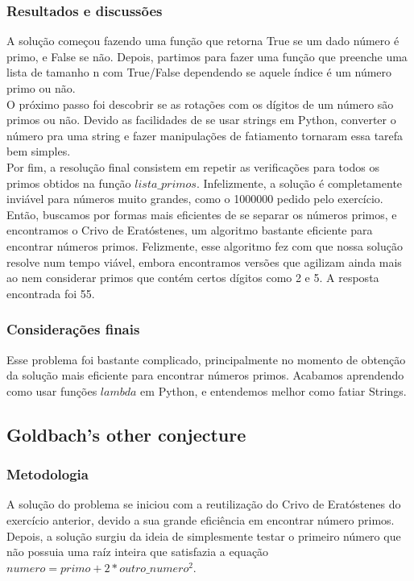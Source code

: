 \documentclass{article}
\begin{document}
        \subsubsection{Resultados e discussões}
        A solução começou fazendo uma função que retorna True se um dado número é primo, e False se não. Depois, partimos para fazer uma função que preenche uma lista de tamanho n com True/False dependendo se aquele índice é um número primo ou não.\\
        O próximo passo foi descobrir se as rotações com os dígitos de um número são primos ou não. Devido as facilidades de se usar strings em Python, converter o número pra uma string e fazer manipulações de fatiamento tornaram essa tarefa bem simples.\\
        Por fim, a resolução final consistem em repetir as verificações para todos os primos obtidos na função $lista\_primos$. Infelizmente, a solução é completamente inviável para números muito grandes, como o 1000000 pedido pelo exercício. Então, buscamos por formas mais eficientes de se separar os números primos, e encontramos o Crivo de Eratóstenes, um algoritmo bastante eficiente para encontrar números primos. Felizmente, esse algoritmo fez com que nossa solução resolve num tempo viável, embora encontramos versões que agilizam ainda mais ao nem considerar primos que contém certos dígitos como 2 e 5.
        A resposta encontrada foi 55.
        
        \subsubsection{Considerações finais}
        Esse problema foi bastante complicado, principalmente no momento de obtenção da solução mais eficiente para encontrar números primos. Acabamos aprendendo como usar funções $lambda$ em Python, e entendemos melhor como fatiar Strings.
        
    \subsection{Goldbach's other conjecture}
        
        \subsubsection{Metodologia}
        A solução do problema se iniciou com a reutilização do Crivo de Eratóstenes do exercício anterior, devido a sua grande eficiência em encontrar número primos. Depois, a solução surgiu da ideia de simplesmente testar o primeiro número que não possuia uma raíz inteira que satisfazia a equação $numero = primo + 2 * outro\_numero^2$.
       
\end{document}
